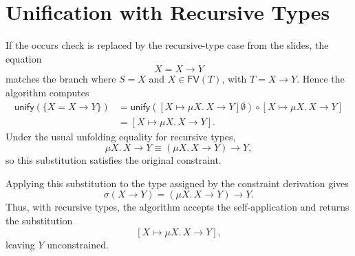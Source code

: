 \documentclass[nonacm]{acmart}
\newcommand{\FV}{\mathsf{FV}}
\begin{document}
\section{Unification with Recursive Types}

If the occurs check is replaced by the recursive-type case from the
slides, the equation
\[
  X = X \to Y
\]
matches the branch where $S=X$ and $X \in \FV(T)$, with
$T = X \to Y$.  Hence the algorithm computes
\[
\begin{aligned}
  \mathsf{unify}(\{X = X \to Y\})
    &=
      \mathsf{unify}([X \mapsto \mu X.\,X \to Y]\emptyset)
      \circ [X \mapsto \mu X.\,X \to Y] \\
    &=
      [X \mapsto \mu X.\,X \to Y].
\end{aligned}
\]
Under the usual unfolding equality for recursive types,
\[
  \mu X.\,X \to Y \equiv (\mu X.\,X \to Y) \to Y,
\]
so this substitution satisfies the original constraint.

Applying this substitution to the type assigned by the constraint
derivation gives
\[
  \sigma(X \to Y)
  =
  (\mu X.\,X \to Y) \to Y.
\]
Thus, with recursive types, the algorithm accepts the self-application
and returns the substitution
\[
  [X \mapsto \mu X.\,X \to Y],
\]
leaving $Y$ unconstrained.
\end{document}

